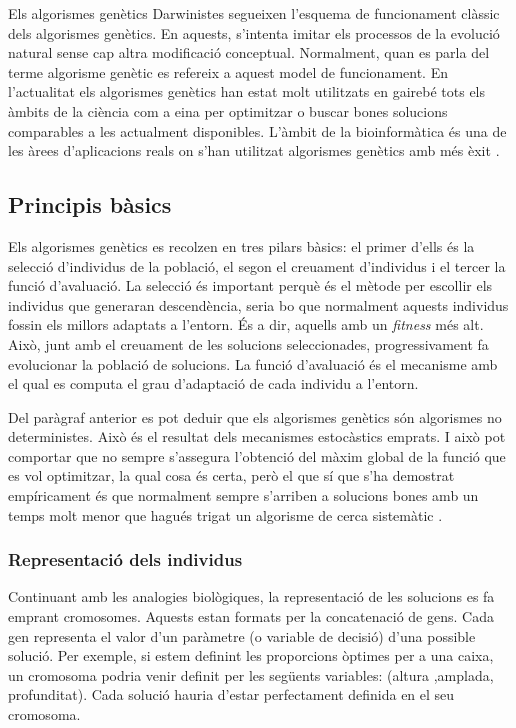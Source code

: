 Els algorismes genètics Darwinistes segueixen l'esquema de funcionament clàssic
dels algorismes genètics. En aquests, s'intenta imitar els processos de la
evolució natural sense cap altra modificació conceptual.  Normalment, quan es
parla del terme algorisme genètic es refereix a aquest model de
funcionament. En l'actualitat els algorismes genètics han estat molt utilitzats
en gairebé tots els àmbits de la ciència com a eina per optimitzar o buscar
bones solucions comparables a les actualment disponibles.  L'àmbit de la
bioinformàtica és una de les àrees d'aplicacions reals on s'han utilitzat algorismes genètics amb
més èxit \cite{PSBE01,D96,wgl:2000,WWBG95}.

\subsection{Principis bàsics}

Els algorismes genètics es recolzen en tres pilars bàsics: el primer d'ells és
la selecció d'individus de la població, el segon el creuament d'individus i el
tercer la funció d'avaluació. La selecció és important perquè és el mètode per
escollir els individus que generaran descendència, seria bo que normalment
aquests individus fossin els millors adaptats a l'entorn. És a dir, aquells amb
un \emph{fitness} més alt.  Això, junt amb el creuament de les solucions
seleccionades, progressivament fa evolucionar la població de solucions. La
funció d'avaluació és el mecanisme amb el qual es computa el grau d'adaptació de
cada individu a l'entorn.

Del paràgraf anterior es pot deduir que els algorismes genètics són algorismes no deterministes.
Això és el resultat dels mecanismes estocàstics emprats. I això pot comportar
que no sempre s'assegura l'obtenció del màxim global de la funció que es vol
optimitzar, la qual cosa és certa, però el que sí que s'ha demostrat
empíricament és que normalment sempre s'arriben a solucions bones amb un temps
molt menor que hagués trigat un algorisme de cerca sistemàtic \cite{BBM93}. 

\subsubsection{Representació dels individus}

Continuant amb les analogies biològiques, la representació de les solucions es
fa emprant cromosomes. Aquests estan formats per la concatenació de gens. Cada
gen representa el valor d'un paràmetre (o variable de decisió) d'una possible
solució.  Per exemple, si estem definint les proporcions òptimes per a una
caixa, un cromosoma podria venir definit per les següents variables:
(altura ,amplada, profunditat). Cada solució hauria d'estar perfectament definida
en el seu cromosoma.


